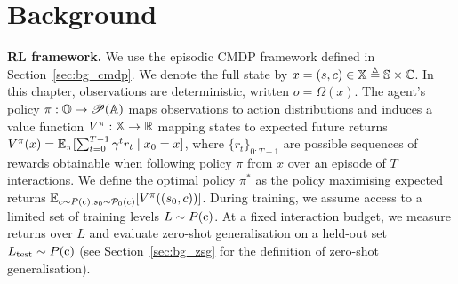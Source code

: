 \section{Background}\label{c2:sec:bg}
%
\textbf{RL framework.} We use the episodic CMDP framework defined in Section~\ref{sec:bg_cmdp}. We denote the full state by $x=(s,c)\in{\mathbb{X}}\triangleq{\mathbb{S}}\times{\mathbb{C}}$. In this chapter, observations are deterministic, written $o=\Omega(x)$. The agent's policy $\pi : {\mathbb{O}} \rightarrow \mathscr{P}({\mathbb{A}})$ maps observations to action distributions and induces a value function $V^\pi : {\mathbb{X}} \rightarrow {\mathbb{R}}$ mapping states to expected future returns $V^\pi(x) = \mathbb{E}_\pi[\sum_{t=0}^{T-1}\gamma^{t} r_t\mid x_0=x]$, where $\{r_t\}_{0:T-1}$ are possible sequences of rewards obtainable when following policy $\pi$ from $x$ over an episode of $T$ interactions. We define the optimal policy $\pi^*$ as the policy maximising expected returns $\mathbb{E}_{c\sim P({\textnormal{c}}), s_0 \sim \mathcal{P}_0(c)}[V^\pi((s_0,c))]$. During training, we assume access to a limited set of training levels $L\sim P({\textnormal{c}})$. At a fixed interaction budget, we measure returns over $L$ and evaluate zero-shot generalisation on a held-out set $L_\text{test}\sim P({\textnormal{c}})$ (see Section~\ref{sec:bg_zsg} for the definition of zero-shot generalisation).

